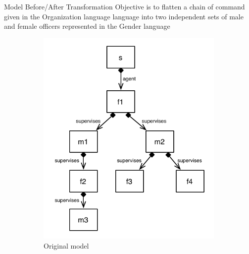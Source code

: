 \documentclass[xcolor=dvipsnames, 14pt]{beamer}
\begin{document}
\begin{frame}{Model Before/After Transformation}
Objective is to flatten a chain of command given in the Organization language language into two independent sets of male and female officers represented in the Gender language
\begin{figure}[htb]
        \centering
        \begin{subfigure}[b]{0.40\textwidth}
                \centering
                \includegraphics[width=1\textwidth]{../figures/policestation_dsltrans/model_police_hierarchy.pdf}
                \caption{Original model}
                \label{fig:police_hierarchy}
        \end{subfigure}%
        ~~
        \begin{subfigure}[b]{0.50\textwidth}
                \centering

\end{subfigure}
\end{figure}
\end{frame}
\end{document}
